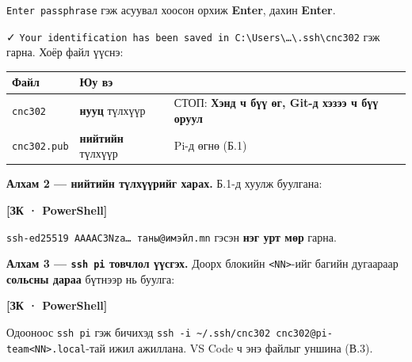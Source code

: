 \texttt{Enter\ passphrase} гэж асуувал хоосон орхиж \textbf{Enter}, дахин \textbf{Enter}.

✓ \texttt{Your\ identification\ has\ been\ saved\ in\ C:\allowbreak{}\textbackslash{}\allowbreak{}Users\textbackslash{}\allowbreak{}\ldots{}\textbackslash{}\allowbreak{}.\allowbreak{}ssh\textbackslash{}\allowbreak{}cnc302} гэж гарна. Хоёр файл үүснэ:

\begingroup\scriptsize\begin{longtable}[]{@{}lll@{}}
\toprule
Файл & Юу вэ &\tabularnewline
\midrule
\endhead
\texttt{cnc302} & \textbf{нууц} түлхүүр & СТОП: \textbf{Хэнд ч бүү өг, Git-д хэзээ ч бүү оруул}\tabularnewline
\texttt{cnc302.pub} & \textbf{нийтийн} түлхүүр & Pi-д өгнө (Б.1)\tabularnewline
\bottomrule
\end{longtable}\endgroup

\textbf{Алхам 2 --- нийтийн түлхүүрийг харах.} Б.1-д хуулж буулгана:

\textbf{{[}ЗК · PowerShell{]}}

\begin{Shaded}
\begin{Highlighting}[]
 
\end{Highlighting}
\end{Shaded}

\texttt{ssh-ed25519\ AAAAC3Nza\ldots{}\ таны@имэйл.\allowbreak{}mn} гэсэн \textbf{нэг урт мөр} гарна.

\textbf{Алхам 3 --- \texttt{ssh\ pi} товчлол үүсгэх.} Доорх блокийн \texttt{\textless{}NN\textgreater{}}-ийг багийн дугаараар \textbf{сольсны дараа} бүтнээр нь буулга:

\textbf{{[}ЗК · PowerShell{]}}

\begin{Shaded}
\begin{Highlighting}[]
 

\end{Highlighting}
\end{Shaded}

Одооноос \texttt{ssh\ pi} гэж бичихэд \texttt{ssh\ -i\ \textasciitilde{}/.ssh/cnc302\ cnc302@pi-team\textless{}NN\textgreater{}.local}-тай ижил ажиллана. VS Code ч энэ файлыг уншина (В.3).

